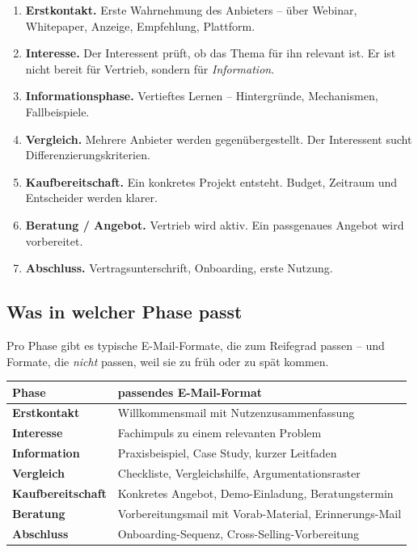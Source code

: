 \documentclass[11pt,a4paper,oneside]{article}
\newcommand{\fachbegriff}[1]{\textbf{#1}}
\begin{document}
\begin{enumerate}
  \item \fachbegriff{Erstkontakt.} Erste Wahrnehmung des Anbieters -- über Webinar, Whitepaper, Anzeige, Empfehlung, Plattform.
  \item \fachbegriff{Interesse.} Der Interessent prüft, ob das Thema für ihn relevant ist. Er ist nicht bereit für Vertrieb, sondern für \emph{Information}.
  \item \fachbegriff{Informationsphase.} Vertieftes Lernen -- Hintergründe, Mechanismen, Fallbeispiele.
  \item \fachbegriff{Vergleich.} Mehrere Anbieter werden gegenübergestellt. Der Interessent sucht Differenzierungskriterien.
  \item \fachbegriff{Kaufbereitschaft.} Ein konkretes Projekt entsteht. Budget, Zeitraum und Entscheider werden klarer.
  \item \fachbegriff{Beratung / Angebot.} Vertrieb wird aktiv. Ein passgenaues Angebot wird vorbereitet.
  \item \fachbegriff{Abschluss.} Vertragsunterschrift, Onboarding, erste Nutzung.
\end{enumerate}

\subsection{Was in welcher Phase passt}

Pro Phase gibt es typische E-Mail-Formate, die zum Reifegrad passen -- und Formate, die \emph{nicht} passen, weil sie zu früh oder zu spät kommen.

\begin{tabularx}{\linewidth}{@{}>{\bfseries}l X@{}}
\toprule
Phase & passendes E-Mail-Format \\
\midrule
Erstkontakt & Willkommensmail mit Nutzenzusammenfassung \\
Interesse & Fachimpuls zu einem relevanten Problem \\
Information & Praxisbeispiel, Case Study, kurzer Leitfaden \\
Vergleich & Checkliste, Vergleichshilfe, Argumentationsraster \\
Kaufbereitschaft & Konkretes Angebot, Demo-Einladung, Beratungstermin \\
Beratung & Vorbereitungsmail mit Vorab-Material, Erinnerungs-Mail \\
Abschluss & Onboarding-Sequenz, Cross-Selling-Vorbereitung \\
\bottomrule
\end{tabularx}
\end{document}
